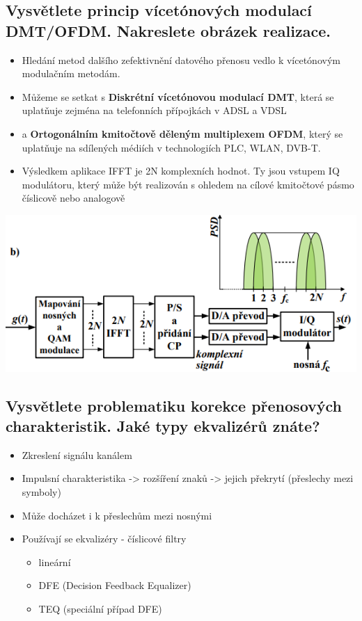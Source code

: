 \subsection{Vysvětlete princip vícetónových modulací DMT/OFDM. Nakreslete obrázek realizace.}
\begin{itemize}
    \item Hledání metod dalšího zefektivnění datového přenosu vedlo k vícetónovým modulačním metodám.
    \item Můžeme se setkat s \textbf{Diskrétní vícetónovou modulací DMT}, která se uplatňuje zejména na telefonních přípojkách v ADSL a VDSL  
    \item a \textbf{Ortogonálním kmitočtově děleným multiplexem OFDM}, který se uplatňuje na sdílených médiích v technologiích PLC, WLAN, DVB-T. 
    \item Výsledkem aplikace IFFT je 2N komplexních hodnot. Ty jsou vstupem IQ modulátoru, který může být realizován s ohledem na cílové kmitočtové pásmo číslicově nebo analogově
\end{itemize}
\includegraphics[]{images/11_dmt_odf.png}
    
\subsection{Vysvětlete problematiku korekce přenosových charakteristik. Jaké typy ekvalizérů znáte?}
\begin{itemize}
    \item Zkreslení signálu kanálem
    \item Impulsní charakteristika -> rozšíření znaků -> jejich překrytí (přeslechy mezi symboly)
    \item Může docházet i k přeslechům mezi nosnými
    \item Používají  se ekvalizéry - číslicové filtry
    \begin{itemize}
        \item lineární
        \item DFE (Decision Feedback Equalizer)
        \item TEQ (speciální případ DFE)
    \end{itemize}
\end{itemize}

